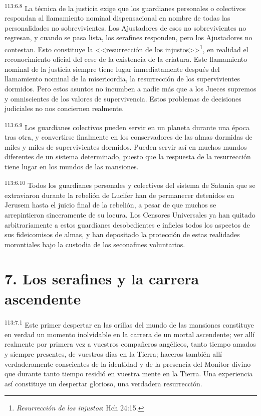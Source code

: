 \documentclass[twoside, 11pt]{book}
\begin{document}
\par
\textsuperscript{113:6.8} La técnica de la justicia exige que los guardianes personales o colectivos respondan al llamamiento nominal dispensacional en nombre de todas las personalidades no sobrevivientes. Los Ajustadores de esos no sobrevivientes no regresan, y cuando se pasa lista, los serafines responden, pero los Ajustadores no contestan. Esto constituye la <<resurrección de los injustos>>\footnote{\textit{Resurrección de los injustos}: Hch 24:15.}, en realidad el reconocimiento oficial del cese de la existencia de la criatura. Este llamamiento nominal de la justicia siempre tiene lugar inmediatamente después del llamamiento nominal de la misericordia, la resurrección de los supervivientes dormidos. Pero estos asuntos no incumben a nadie más que a los Jueces supremos y omniscientes de los valores de supervivencia. Estos problemas de decisiones judiciales no nos conciernen realmente.

\par
\textsuperscript{113:6.9} Los guardianes colectivos pueden servir en un planeta durante una época tras otra, y convertirse finalmente en los conservadores de las almas dormidas de miles y miles de supervivientes dormidos. Pueden servir así en muchos mundos diferentes de un sistema determinado, puesto que la respuesta de la resurrección tiene lugar en los mundos de las mansiones.

\par
\textsuperscript{113:6.10} Todos los guardianes personales y colectivos del sistema de Satania que se extraviaron durante la rebelión de Lucifer han de permanecer detenidos en Jerusem hasta el juicio final de la rebelión, a pesar de que muchos se arrepintieron sinceramente de su locura. Los Censores Universales ya han quitado arbitrariamente a estos guardianes desobedientes e infieles todos los aspectos de sus fideicomisos de almas, y han depositado la protección de estas realidades morontiales bajo la custodia de los seconafines voluntarios.

\section*{7. Los serafines y la carrera ascendente}
\par
\textsuperscript{113:7.1} Este primer despertar en las orillas del mundo de las mansiones constituye en verdad un momento inolvidable en la carrera de un mortal ascendente; ver allí realmente por primera vez a vuestros compañeros angélicos, tanto tiempo amados y siempre presentes, de vuestros días en la Tierra; haceros también allí verdaderamente conscientes de la identidad y de la presencia del Monitor divino que durante tanto tiempo residió en vuestra mente en la Tierra. Una experiencia así constituye un despertar glorioso, una verdadera resurrección.
\end{document}
